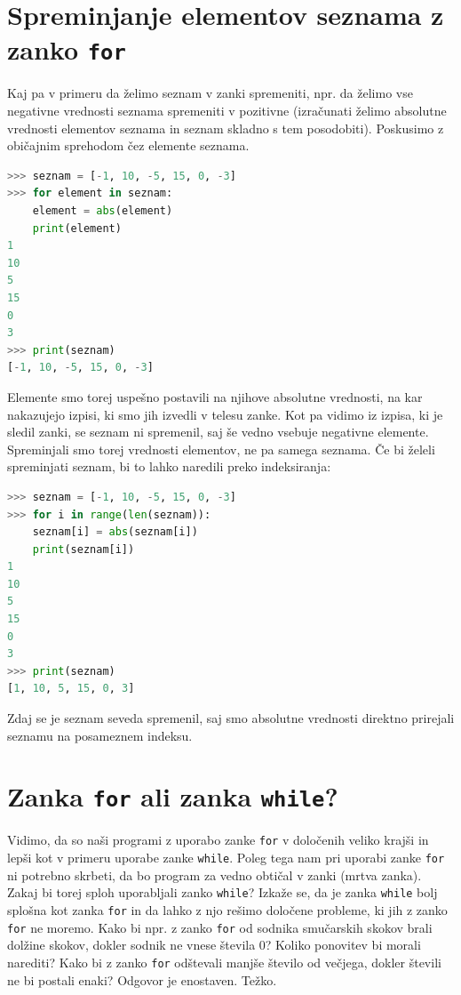 \section{Spreminjanje elementov seznama z zanko \texttt{for}}
Kaj pa v primeru da želimo seznam v zanki spremeniti, npr. da želimo vse negativne vrednosti seznama spremeniti v pozitivne (izračunati želimo absolutne vrednosti elementov seznama in seznam skladno s tem posodobiti). Poskusimo z običajnim sprehodom čez elemente seznama.
\begin{lstlisting}[language=Python, showstringspaces=false]
>>> seznam = [-1, 10, -5, 15, 0, -3]
>>> for element in seznam:
	element = abs(element)
	print(element)
1
10
5
15
0
3
>>> print(seznam)
[-1, 10, -5, 15, 0, -3]
\end{lstlisting}
Elemente smo torej uspešno postavili na njihove absolutne vrednosti, na kar nakazujejo izpisi, ki smo jih izvedli v telesu zanke. Kot pa vidimo iz izpisa, ki je sledil zanki, se seznam ni spremenil, saj še vedno vsebuje negativne elemente. Spreminjali smo torej vrednosti elementov, ne pa samega seznama. Če bi želeli spreminjati seznam, bi to lahko naredili preko indeksiranja:
\begin{lstlisting}[language=Python, showstringspaces=false]
>>> seznam = [-1, 10, -5, 15, 0, -3]
>>> for i in range(len(seznam)):
	seznam[i] = abs(seznam[i])
	print(seznam[i])
1
10
5
15
0
3
>>> print(seznam)
[1, 10, 5, 15, 0, 3]
\end{lstlisting}
Zdaj se je seznam seveda spremenil, saj smo absolutne vrednosti direktno prirejali seznamu na posameznem indeksu.

\section{Zanka \texttt{for} ali zanka \texttt{while}?}
Vidimo, da so naši programi z uporabo zanke \texttt{for} v določenih veliko krajši in lepši kot v primeru uporabe zanke \texttt{while}. Poleg tega nam pri uporabi zanke \texttt{for} ni potrebno skrbeti, da bo program za vedno obtičal v zanki (mrtva zanka). Zakaj bi torej sploh uporabljali zanko \texttt{while}? Izkaže se, da je zanka \texttt{while} bolj splošna kot zanka \texttt{for} in da lahko z njo rešimo določene probleme, ki jih z zanko \texttt{for} ne moremo. Kako bi npr. z zanko \texttt{for} od sodnika smučarskih skokov brali dolžine skokov, dokler sodnik ne vnese števila 0? Koliko ponovitev bi morali narediti? Kako bi z zanko \texttt{for} odštevali manjše število od večjega, dokler števili ne bi postali enaki? Odgovor je enostaven. Težko.

